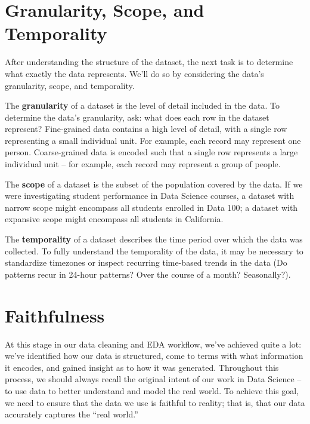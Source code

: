 \documentclass[
  letterpaper,
  DIV=11,
  numbers=noendperiod]{scrreprt}
\begin{document}
\hypertarget{granularity-scope-and-temporality}{%
\section{Granularity, Scope, and
Temporality}\label{granularity-scope-and-temporality}}

After understanding the structure of the dataset, the next task is to
determine what exactly the data represents. We'll do so by considering
the data's granularity, scope, and temporality.

The \textbf{granularity} of a dataset is the level of detail included in
the data. To determine the data's granularity, ask: what does each row
in the dataset represent? Fine-grained data contains a high level of
detail, with a single row representing a small individual unit. For
example, each record may represent one person. Coarse-grained data is
encoded such that a single row represents a large individual unit -- for
example, each record may represent a group of people.

The \textbf{scope} of a dataset is the subset of the population covered
by the data. If we were investigating student performance in Data
Science courses, a dataset with narrow scope might encompass all
students enrolled in Data 100; a dataset with expansive scope might
encompass all students in California.

The \textbf{temporality} of a dataset describes the time period over
which the data was collected. To fully understand the temporality of the
data, it may be necessary to standardize timezones or inspect recurring
time-based trends in the data (Do patterns recur in 24-hour patterns?
Over the course of a month? Seasonally?).

\hypertarget{faithfulness}{%
\section{Faithfulness}\label{faithfulness}}

At this stage in our data cleaning and EDA workflow, we've achieved
quite a lot: we've identified how our data is structured, come to terms
with what information it encodes, and gained insight as to how it was
generated. Throughout this process, we should always recall the original
intent of our work in Data Science -- to use data to better understand
and model the real world. To achieve this goal, we need to ensure that
the data we use is faithful to reality; that is, that our data
accurately captures the ``real world.''
\end{document}
